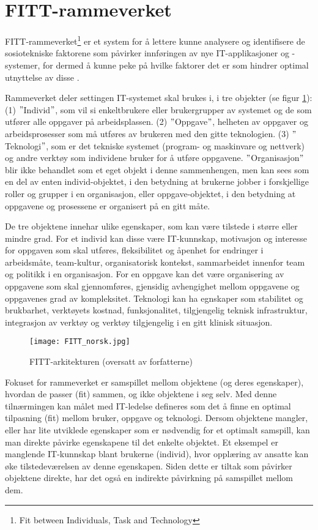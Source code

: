 \section{FITT-rammeverket}
\label{sec:fitt-rammeverket}

FITT-rammeverket\footnote{Fit between Individuals, Task and Technology} er et system for å lettere kunne analysere og identifisere de sosiotekniske faktorene som påvirker innføringen av nye IT-applikasjoner og -systemer, for dermed å kunne peke på hvilke faktorer det er som hindrer optimal utnyttelse av disse \citep{FITT}.

\noindent
Rammeverket deler settingen IT-systemet skal brukes i, i tre objekter (se figur \ref{FITT-arkitekturen}): (1) $"$Individ$"$, som vil si enkeltbrukere eller brukergrupper av systemet og de som utfører alle oppgaver på arbeidsplassen. (2) $"$Oppgave$"$, helheten av oppgaver og arbeidsprosesser som må utføres av brukeren med den gitte teknologien. (3) $"$Teknologi$"$, som er det tekniske systemet (program- og maskinvare og nettverk) og andre verktøy som individene bruker for å utføre oppgavene.
$"$Organisasjon$"$ blir ikke behandlet som et eget objekt i denne sammenhengen, men kan sees som en del av enten individ-objektet, i den betydning at brukerne jobber i forskjellige roller og grupper i en organisasjon, eller oppgave-objektet, i den betydning at oppgavene og prosessene er organisert på en gitt måte.

\noindent
De tre objektene innehar ulike egenskaper, som kan være tilstede i større eller mindre grad. For et individ kan disse være IT-kunnskap, motivasjon og interesse for oppgaven som skal utføres, fleksibilitet og åpenhet for endringer i arbeidsmåte, team-kultur, organisatorisk kontekst, sammarbeidet innenfor team og politikk i en organisasjon. For en oppgave kan det være organisering av oppgavene som skal gjennomføres, gjensidig avhengighet mellom oppgavene og oppgavenes grad av kompleksitet. Teknologi kan ha egnskaper som stabilitet og brukbarhet, verktøyets kostnad, funksjonalitet, tilgjengelig teknisk infrastruktur, integrasjon av verktøy og verktøy tilgjengelig i en gitt klinisk situasjon.

\begin{figure}[H]
\centering
\texttt{[image: FITT\_norsk.jpg]}
\caption{FITT-arkitekturen \citep{FITT} (oversatt av forfatterne)}
\label{FITT-arkitekturen}
\end{figure}

\noindent
Fokuset for rammeverket er samspillet mellom objektene (og deres egenskaper), hvordan de passer (fit) sammen, og ikke objektene i seg selv. Med denne tilnærmingen kan målet med IT-ledelse defineres som det å finne en optimal tilpasning (fit) mellom bruker, oppgave og teknologi. Dersom objektene mangler, eller har lite utviklede egenskaper som er nødvendig for et optimalt samspill, kan man direkte påvirke egenskapene til det enkelte objektet. Et eksempel er manglende IT-kunnskap blant brukerne (individ), hvor opplæring av ansatte kan øke tilstedeværelsen av denne egenskapen. Siden dette er tiltak som påvirker objektene direkte, har det også en indirekte påvirkning på samspillet mellom dem.

